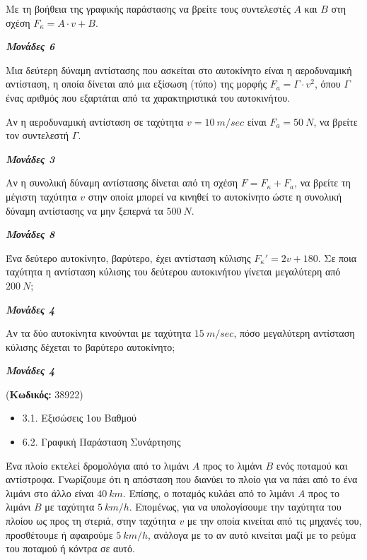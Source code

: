 \documentclass[11pt,a4paper,twoside]{book}
\newcounter{askhsh}[chapter]
\renewcommand{\theaskhsh}{
	\bf{\titlefont{\Large{\thechapter}}.\arabic{askhsh}}
}
\newcommand{\Askhsh}[2]{\refstepcounter{askhsh}{\titlefont{Άσκηση\theaskhsh} - \textcolor{maincolor}{ΘΕΜΑ #2}} ({\small{\textbf{Κωδικός:} #1}})\\}{}
\newenvironment{ylh}{
\begin{tcolorbox}[
breakable,
enhanced standard,
titlerule=0pt,
toprule=0pt, 
rightrule=0pt, 
bottomrule=0pt,
title={\titlefont Ύλη άσκησης},
colback=white,
opacityback=0,
left=2mm,
top=1mm,
bottom=0mm,
boxrule=0pt,
colframe=white,
borderline west={1.5mm}{0pt}{secondarycolor},
leftrule=2mm,
sharp corners,
coltitle=black
]
\begin{itemize}[leftmargin=3mm, itemsep=0mm, label=\textcolor{secondarycolor}{{\small\faBook}}]
}{
\end{itemize}
\end{tcolorbox}
}
\newcommand{\monades}[1]{
\hspace*{\fill}
\textbf{\textit{\textcolor{maincolor}{Μονάδες #1}}}}
\begin{document}
\begin{alist}
\item Με τη βοήθεια της γραφικής παράστασης να βρείτε τους συντελεστές $A$ και $B$ στη σχέση $F_\kappa = A \cdot v + B$.
\monades{6}
\item Μια δεύτερη δύναμη αντίστασης που ασκείται στο αυτοκίνητο είναι η αεροδυναμική αντίσταση, η οποία δίνεται από μια εξίσωση (τύπο) της μορφής $F_a = \Gamma \cdot v^{2}$, όπου $\Gamma$ ένας αριθμός που εξαρτάται από τα χαρακτηριστικά του αυτοκινήτου.

\begin{rlist}
\item Αν η αεροδυναμική αντίσταση σε ταχύτητα $v = 10\ \si{m/sec}$ είναι $F_a = 50\ \si{N}$, να βρείτε τον συντελεστή $\Gamma$.
\monades{3}
\item Αν η συνολική δύναμη αντίστασης δίνεται από τη σχέση $F = F_\kappa + F_a$, να βρείτε τη μέγιστη ταχύτητα $v$ στην οποία μπορεί να κινηθεί το αυτοκίνητο ώστε η συνολική δύναμη αντίστασης να μην ξεπερνά τα $500\ N$.
\monades{8}
\end{rlist}
\item Ένα δεύτερο αυτοκίνητο, βαρύτερο, έχει αντίσταση κύλισης $F_\kappa' = 2v + 180$. Σε ποια ταχύτητα η αντίσταση κύλισης του δεύτερου αυτοκινήτου γίνεται μεγαλύτερη από $200\ \si{N}$;
\monades{4}
\item Αν τα δύο αυτοκίνητα κινούνται με ταχύτητα $15\ \si{m/sec}$, πόσο μεγαλύτερη αντίσταση κύλισης δέχεται το βαρύτερο αυτοκίνητο;
\monades{4}
\end{alist}

\vspace{4mm}
\Askhsh{38922}{4}
\begin{ylh}
    \item 3.1. Εξισώσεις 1ου Βαθμού
    \item 6.2. Γραφική Παράσταση Συνάρτησης
\end{ylh}

Ένα πλοίο εκτελεί δρομολόγια από το λιμάνι $A$ προς το λιμάνι $B$ ενός ποταμού και αντίστροφα. Γνωρίζουμε ότι η απόσταση που διανύει το πλοίο για να πάει από το ένα λιμάνι στο άλλο είναι $40\ km$. Επίσης, ο ποταμός κυλάει από το λιμάνι $A$ προς το λιμάνι $B$ με ταχύτητα $5\ km/h$. Επομένως, για να υπολογίσουμε την ταχύτητα του πλοίου ως προς τη στεριά, στην ταχύτητα $v$ με την οποία κινείται από τις μηχανές του, προσθέτουμε ή αφαιρούμε $5\ km/h$, ανάλογα με το αν αυτό κινείται μαζί με το ρεύμα του ποταμού ή κόντρα σε αυτό.
\end{document}
